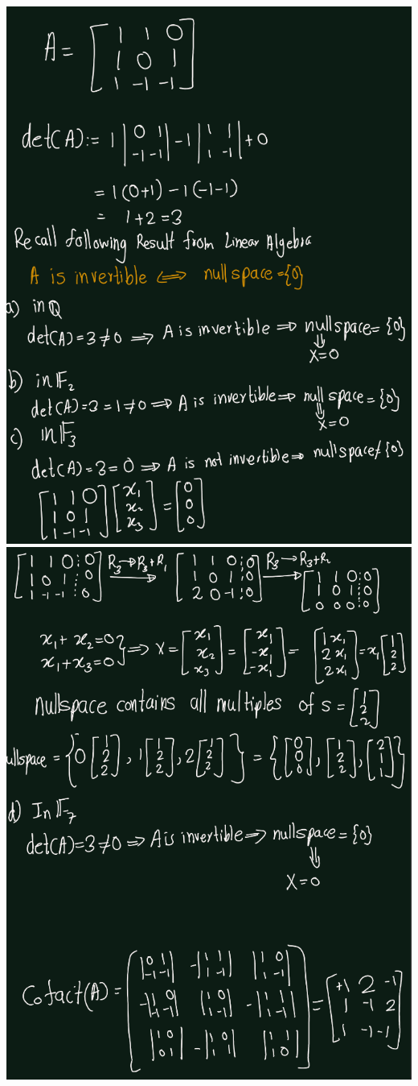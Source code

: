 \documentclass[
]{book}
\theoremstyle{definition}
\theoremstyle{definition}
\theoremstyle{definition}
\theoremstyle{definition}
\theoremstyle{remark}
\begin{document}
\includegraphics{figures/ch_3/ex-1.6-1.png}
\includegraphics{figures/ch_3/ex-1.6-2.png}
\end{document}
